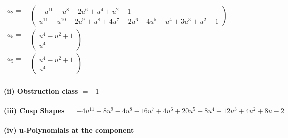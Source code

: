 \documentclass[1p]{elsarticle_modified}
\theoremstyle{definition}
\begin{document}
\begin{tabular}{m{7pt} m{180pt} m{7pt} m{180pt} }
\flushright $a_{2}=$&$\begin{pmatrix}- u^{10}+u^8-2 u^6+u^4+u^2-1\\u^{11}- u^{10}-2 u^9+u^8+4 u^7-2 u^6-4 u^5+u^4+3 u^3+u^2-1\end{pmatrix}$ \\
\flushright $a_{5}=$&$\begin{pmatrix}u^4- u^2+1\\u^4\end{pmatrix}$\\ \flushright $a_{5}=$&$\begin{pmatrix}u^4- u^2+1\\u^4\end{pmatrix}$\\&\end{tabular}
\flushleft \textbf{(ii) Obstruction class $= -1$}\\~\\
\flushleft \textbf{(iii) Cusp Shapes $= -4 u^{11}+8 u^9-4 u^8-16 u^7+4 u^6+20 u^5-8 u^4-12 u^3+4 u^2+8 u-2$}\\~\\
\newpage\renewcommand{\arraystretch}{1}
\flushleft \textbf{(iv) u-Polynomials at the component}\newline \\
\end{document}
